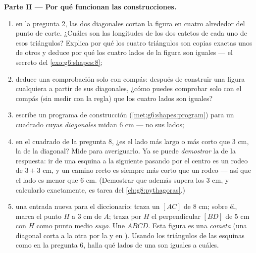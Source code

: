 \begin{problem}
\medskip
\noindent\textbf{Parte II --- Por qué funcionan las construcciones.}
\begin{enumerate}[resume]
  \item en la pregunta 2, las dos diagonales cortan la figura en cuatro
         alrededor del punto de corte. ¿Cuáles son las
        longitudes de los dos catetos de cada uno de esos triángulos? Explica por qué
        los cuatro triángulos son copias exactas unos de otros y
        deduce por qué los cuatro lados de la figura son iguales --- el
        secreto del \cref{exo:g6:shapes:8};
  \item deduce una comprobación solo con compás: después de construir una figura
        cualquiera a partir de sus diagonales, ¿cómo puedes comprobar solo con el compás
        (sin medir con la regla) que los cuatro lados son
        iguales?
  \item escribe un programa de construcción
        (\cref{met:g6:shapes:program}) para un cuadrado cuyas
        \emph{diagonales} midan $6$ cm --- no sus lados;
  \item en el cuadrado de la pregunta 8, ¿es el lado más largo o más
        corto que $3$ cm, la  de la diagonal? Mide para
        averiguarlo. Ya se puede \emph{demostrar} la  de la
        respuesta: ir de una esquina a la siguiente pasando por el
        centro es un rodeo de $3 + 3$ cm, y un camino recto es
        siempre más corto que un rodeo --- así que el lado es menor
        que $6$ cm. (Demostrar que además supera los $3$ cm, y
        calcularlo exactamente, es tarea del
        \cref{ch:g8:pythagoras}.)
  \item una entrada nueva para el diccionario: traza un  $[AC]$ de
        $8$ cm; sobre él, marca el punto $H$ a $3$ cm de $A$;
        traza por $H$ el  perpendicular $[BD]$ de
        $5$ cm con $H$ como punto medio \emph{suyo}. Une $ABCD$. Esta
        figura es una \emph{cometa} (una diagonal corta a
        la otra por la  y en ). Usando los triángulos de las esquinas como
        en la pregunta 6, halla qué lados de una  son iguales a
        cuáles.
\end{enumerate}


\end{problem}
